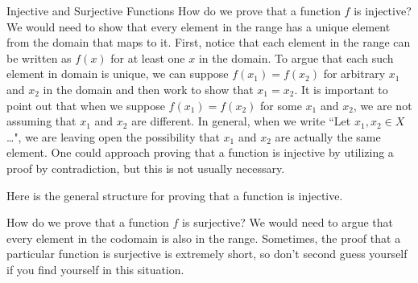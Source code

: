 \begin{section}{Injective and Surjective Functions}
How do we prove that a function $f$ is injective? We would need to show that every element in the range has a unique element from the domain that maps to it. First, notice that each element in the range can be written as $f(x)$ for at least one $x$ in the domain.  To argue that each such element in domain is unique, we can suppose $f(x_{1})=f(x_{2})$ for arbitrary $x_1$ and $x_2$ in the domain and then work to show that $x_{1}=x_{2}$.  It is important to point out that when we suppose $f(x_{1})=f(x_{2})$ for some $x_1$ and $x_2$, we are not assuming that $x_1$ and $x_2$ are different. In general, when we write ``Let $x_1,x_2\in X$\ldots", we are leaving open the possibility that $x_1$ and $x_2$ are actually the same element. One could approach proving that a function is injective by utilizing a proof by contradiction, but this is not usually necessary.

\begin{skeleton}
Here is the general structure for proving that a function is injective.
\begin{center}
\end{center}
\end{skeleton}

How do we prove that a function $f$ is surjective? We would need to argue that every element in the codomain is also in the range.  Sometimes, the proof that a particular function is surjective is extremely short, so don't second guess yourself if you find yourself in this situation.  


\end{section}
